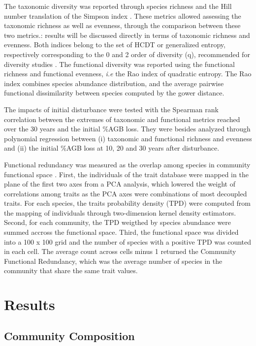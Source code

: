 \documentclass[fleqn,10pt]{ArtEcoFoG} %
\begin{document}
The taxonomic diversity was reported through species richness and the
Hill number translation of the Simpson index \citep{Hill1973}. These
metrics allowed assessing the taxonomic richness as well as evenness,
through the comparison between these two metrics.: results will be
discussed directly in terms of taxonomic richness and evenness. Both
indices belong to the set of HCDT or generalized entropy, respectively
corresponding to the 0 and 2 order of diversity (q), recommended for
diversity studies \citep{Marcon2015b}. The functional diversity was
reported using the functional richness and functional evenness,
\emph{i.e} the Rao index of quadratic entropy. The Rao index combines
species abundance distribution, and the average pairwise functional
dissimilarity between species computed by the gower distance.

The impacts of initial disturbance were tested with the Spearman rank
correlation between the extremes of taxonomic and functional metrics
reached over the 30 years and the initial \%AGB loss. They were besides
analyzed through polynomial regression between (i) taxonomic and
functional richness and evenness and (ii) the initial \%AGB loss at 10,
20 and 30 years after disturbance.

Functional redundancy was measured as the overlap among species in
community functional space \citep{Carmona2016}. First, the individuals
of the trait database were mapped in the plane of the first two axes
from a PCA analysis, which lowered the weight of correlations among
traits as the PCA axes were combinations of most decoupled traits. For
each species, the traits probability density (TPD) were computed from
the mapping of individuals through two-dimension kernel density
estimators. Second, for each community, the TPD weigthed by species
abundance were summed accross the functional space. Third, the
functional space was divided into a 100 x 100 grid and the number of
species with a positive TPD was counted in each cell. The average count
across cells minus 1 returned the Community Functional Redundancy, which
was the average number of species in the community that share the same
trait values.

\section{Results}\label{results}

\subsection{Community Composition}\label{community-composition}
\end{document}
